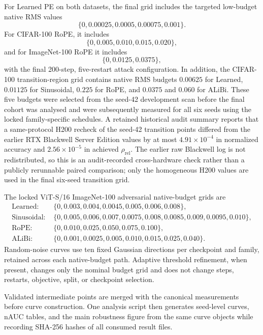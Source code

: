 \documentclass[preprint,12pt,authoryear]{elsarticle}
\begin{document}
For Learned PE on both datasets, the final grid includes the targeted
low-budget native RMS values
\[
\{0,0.00025,0.0005,0.00075,0.001\}.
\]
For CIFAR-100 RoPE, it includes
\[
\{0,0.005,0.010,0.015,0.020\},
\]
and for ImageNet-100 RoPE it includes
\[
\{0,0.0125,0.0375\},
\]
with the final 200-step, five-restart attack configuration. In addition,
the CIFAR-100 transition-region grid contains native RMS budgets $0.00625$
for Learned, $0.01125$ for Sinusoidal, $0.225$ for RoPE, and $0.0375$ and
$0.060$ for ALiBi. These five budgets were selected from the seed-42
development scan before the final cohort was analysed and were subsequently
measured for all six seeds using the locked family-specific schedules. A retained historical audit summary reports that a same-protocol H200
recheck of the seed-42 transition points differed from the earlier RTX Blackwell
Server Edition values by at most $4.91\times10^{-4}$ in normalized accuracy
and $2.56\times10^{-5}$ in achieved $\rho_{\mathrm{rel}}$. The earlier raw
Blackwell log is not redistributed, so this is an audit-recorded cross-hardware
check rather than a publicly rerunnable paired comparison; only the homogeneous
H200 values are used in the final six-seed transition grid.

The locked ViT-S/16 ImageNet-100 adversarial native-budget grids are
\begin{align*}
\text{Learned: }&\{0,0.003,0.004,0.0045,0.005,0.006,0.008\},\\
\text{Sinusoidal: }&\{0,0.005,0.006,0.007,0.0075,0.008,0.0085,0.009,0.0095,0.010\},\\
\text{RoPE: }&\{0,0.010,0.025,0.050,0.075,0.100\},\\
\text{ALiBi: }&\{0,0.001,0.0025,0.005,0.010,0.015,0.025,0.040\}.
\end{align*}
Random-noise curves use ten fixed Gaussian directions per checkpoint and
family, retained across each native-budget path. Adaptive threshold
refinement, when present, changes only the nominal budget grid and does
not change steps, restarts, objective, split, or checkpoint selection.

Validated intermediate points are merged with the canonical measurements
before curve construction. One analysis script then generates seed-level
curves, nAUC tables, and the main robustness figure from the same curve
objects while recording SHA-256 hashes of all consumed result files.

\end{document}
